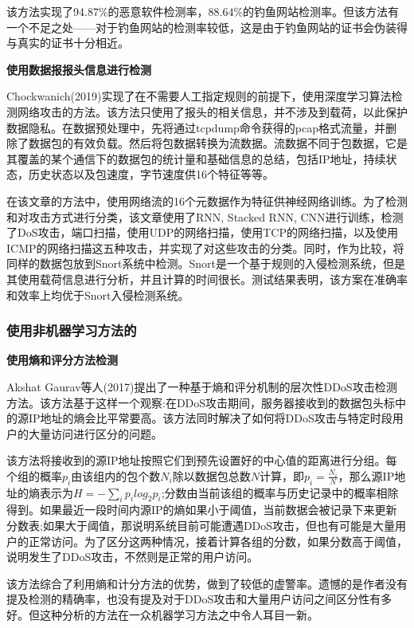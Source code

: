 \documentclass[12pt]{article} %
\begin{document}
该方法实现了94.87\%的恶意软件检测率，88.64\%的钓鱼网站检测率。但该方法有一个不足之处——对于钓鱼网站的检测率较低，这是由于钓鱼网站的证书会伪装得与真实的证书十分相近。

\textbf{使用数据报报头信息进行检测}

Chockwanich(2019)\cite{Chockwanich}实现了在不需要人工指定规则的前提下，使用深度学习算法检测网络攻击的方法。该方法只使用了报头的相关信息，并不涉及到载荷，以此保护数据隐私。在数据预处理中，先将通过tcpdump命令获得的pcap格式流量，并删除了数据包的有效负载。然后将包数据转换为流数据。流数据不同于包数据，它是其覆盖的某个通信下的数据包的统计量和基础信息的总结，包括IP地址，持续状态，历史状态以及包速度，字节速度供16个特征等等。

在该文章的方法中，使用网络流的16个元数据作为特征供神经网络训练。为了检测和对攻击方式进行分类，该文章使用了RNN, Stacked RNN, CNN进行训练，检测了DoS攻击，端口扫描，使用UDP的网络扫描，使用TCP的网络扫描，以及使用ICMP的网络扫描这五种攻击，并实现了对这些攻击的分类。同时，作为比较，将同样的数据包放到Snort系统中检测。Snort是一个基于规则的入侵检测系统，但是其使用载荷信息进行分析，并且计算的时间很长。测试结果表明，该方案在准确率和效率上均优于Snort入侵检测系统。
\subsubsection{使用非机器学习方法的}
\label{nonml}

\textbf{使用熵和评分方法检测}

Akshat Gaurav等人(2017)\cite{entropy}提出了一种基于熵和评分机制的层次性DDoS攻击检测方法。该方法基于这样一个观察:在DDoS攻击期间，服务器接收到的数据包头标中的源IP地址的熵会比平常要高。该方法同时解决了如何将DDoS攻击与特定时段用户的大量访问进行区分的问题。

该方法将接收到的源IP地址按照它们到预先设置好的中心值的距离进行分组。每个组的概率$p_i$由该组内的包个数$N_i$除以数据包总数$N$计算，即$p_i = \frac{N_i}{N}$，那么源IP地址的熵表示为$H = -\sum_i p_ilog_2 p_i$;分数由当前该组的概率与历史记录中的概率相除得到。如果最近一段时间内源IP的熵如果小于阈值，当前数据会被记录下来更新分数表;如果大于阈值，那说明系统目前可能遭遇DDoS攻击，但也有可能是大量用户的正常访问。为了区分这两种情况，接着计算各组的分数，如果分数高于阈值，说明发生了DDoS攻击，不然则是正常的用户访问。

该方法综合了利用熵和计分方法的优势，做到了较低的虚警率。遗憾的是作者没有提及检测的精确率，也没有提及对于DDoS攻击和大量用户访问之间区分性有多好。但这种分析的方法在一众机器学习方法之中令人耳目一新。
\end{document}
